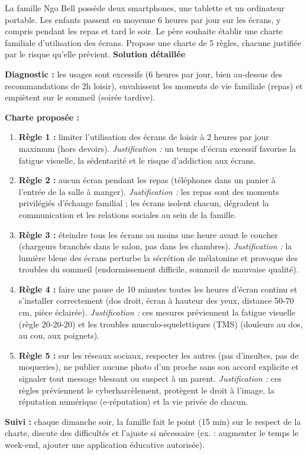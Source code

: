 \documentclass[11pt]{article}
\newcommand{\cle}[1]{{\popxbold\color{popdark}#1}}
\begin{document}
\begin{exoresolu}
La famille Ngo Bell possède deux smartphones, une tablette et un ordinateur portable. Les enfants passent en moyenne 6 heures par jour sur les écrans, y compris pendant les repas et tard le soir. Le père souhaite établir une charte familiale d'utilisation des écrans. Propose une charte de 5 règles, chacune justifiée par le risque qu'elle prévient.
\tcblower
\textbf{Solution détaillée}

\textbf{Diagnostic :} les usages sont excessifs (6 heures par jour, bien au-dessus des recommandations de 2h loisir), envahissent les moments de vie familiale (repas) et empiètent sur le sommeil (soirée tardive).

\textbf{Charte proposée :}
\begin{enumerate}
\item \textbf{Règle 1 :} limiter l'utilisation des écrans de loisir à 2 heures par jour maximum (hors devoirs). \emph{Justification :} un temps d'écran excessif favorise la \cle{fatigue visuelle}, la \cle{sédentarité} et le risque d'\cle{addiction} aux écrans.
\item \textbf{Règle 2 :} aucun écran pendant les repas (téléphones dans un panier à l'entrée de la salle à manger). \emph{Justification :} les repas sont des moments privilégiés d'échange familial ; les écrans isolent chacun, dégradent la communication et les relations sociales au sein de la famille.
\item \textbf{Règle 3 :} éteindre tous les écrans au moins une heure avant le coucher (chargeurs branchés dans le salon, pas dans les chambres). \emph{Justification :} la \cle{lumière bleue} des écrans perturbe la sécrétion de mélatonine et provoque des \cle{troubles du sommeil} (endormissement difficile, sommeil de mauvaise qualité).
\item \textbf{Règle 4 :} faire une pause de 10 minutes toutes les heures d'écran continu et s'installer correctement (dos droit, écran à hauteur des yeux, distance 50-70 cm, pièce éclairée). \emph{Justification :} ces mesures préviennent la \cle{fatigue visuelle} (règle 20-20-20) et les \cle{troubles musculo-squelettiques (TMS)} (douleurs au dos, au cou, aux poignets).
\item \textbf{Règle 5 :} sur les réseaux sociaux, respecter les autres (pas d'insultes, pas de moqueries), ne publier aucune photo d'un proche sans son accord explicite et signaler tout message blessant ou suspect à un parent. \emph{Justification :} ces règles préviennent le \cle{cyberharcèlement}, protègent le \cle{droit à l'image}, la \cle{réputation numérique} (e-réputation) et la vie privée de chacun.
\end{enumerate}
\textbf{Suivi :} chaque dimanche soir, la famille fait le point (15 min) sur le respect de la charte, discute des difficultés et l'ajuste si nécessaire (ex. : augmenter le temps le week-end, ajouter une application éducative autorisée).


\end{exoresolu}
\end{document}
